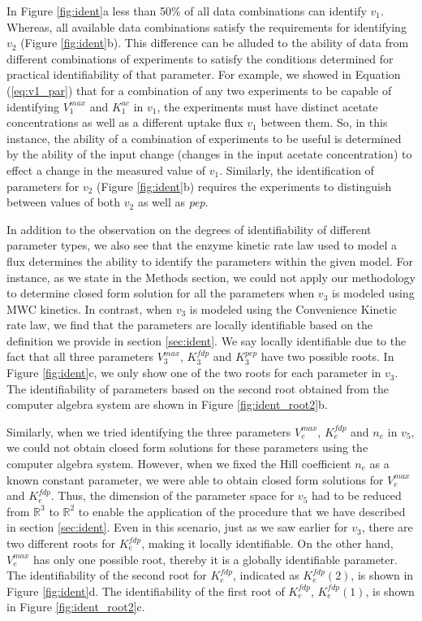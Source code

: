 \documentclass[10pt]{article}
\begin{document}
	In Figure \ref{fig:ident}a less than 50\% of all data combinations can identify $v_1$. Whereas, all available data combinations satisfy the requirements for identifying $v_2$ (Figure \ref{fig:ident}b). This difference can be alluded to the ability of data from different combinations of experiments to satisfy the conditions determined for practical identifiability of that parameter. For example, we showed in Equation (\ref{eq:v1_par}) that for a combination of any two experiments to be capable of identifying $V_1^{max}$ and $K_1^{ac}$ in $v_1$, the experiments must have distinct acetate concentrations as well as a different uptake flux $v_1$ between them. So, in this instance, the ability of a combination of experiments to be useful is determined by the ability of the input change (changes in the input acetate concentration) to effect a change in the measured value of $v_1$. Similarly, the identification of parameters for $v_2$ (Figure \ref{fig:ident}b) requires the experiments to distinguish between values of both $v_2$ as well as \textit{pep}.
		
	In addition to the observation on the degrees of identifiability of different parameter types, we also see that the enzyme kinetic rate law used to model a flux determines the ability to identify the parameters within the given model. For instance, as we state in the Methods section, we could not apply our methodology to determine closed form solution for all the parameters when $v_3$ is modeled using MWC kinetics. In contrast, when $v_3$ is modeled using the Convenience Kinetic rate law, we find that the parameters are locally identifiable based on the definition we provide in section \ref{sec:ident}. We say locally identifiable due to the fact that all three parameters $V_3^{max}$, $K_3^{fdp}$ and $K_3^{pep}$ have two possible roots. In Figure \ref{fig:ident}c, we only show one of the two roots for each parameter in $v_3$. The identifiability of parameters based on the second root obtained from the computer algebra system are shown in Figure \ref{fig:ident_root2}b. 
	
	Similarly, when we tried identifying the three parameters $V_e^{max}$, $K_e^{fdp}$ and $n_e$ in $v_5$, we could not obtain closed form solutions for these parameters using the computer algebra system. However, when we fixed the Hill coefficient $n_e$ as a known constant parameter, we were able to obtain closed form solutions for $V_e^{max}$ and $K_e^{fdp}$. Thus, the dimension of the parameter space for $v_5$ had to be reduced from $\mathbb{R}^3$ to $\mathbb{R}^2$ to enable the application of the procedure that we have described in section \ref{sec:ident}. Even in this scenario, just as we saw earlier for $v_3$, there are two different roots for $K_e^{fdp}$, making it locally identifiable. On the other hand, $V_e^{max}$ has only one possible root, thereby it is a globally identifiable parameter. The identifiability of the second root for $K_e^{fdp}$, indicated as $K_e^{fdp}(2)$, is shown in Figure \ref{fig:ident}d. The identifiability of the first root of $K_e^{fdp}$, $K_e^{fdp}(1)$, is shown in Figure \ref{fig:ident_root2}c.
	
\end{document}
